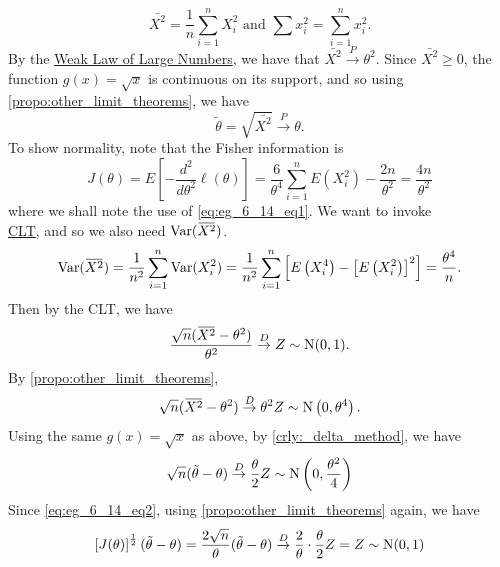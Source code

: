 \documentclass[notoc,notitlepage]{tufte-book}
\newcommand{\convd}{\overset{D}{\to}}
\newcommand{\convp}{\overset{P}{\to}}
\begin{document}
\begin{solution}
\begin{equation*}
    \bar{X^2} = \frac{1}{n} \sum_{i=1}^{n} X_i^2 \text{ and } \sum x_i^2 = \sum_{i=1}^{n} x_i^2.
  \end{equation*}
  By the \hyperref[eg:weak_law_of_large_numbers]{Weak Law of Large Numbers}, we have that $\bar{X^2} \convp \theta^2$. Since $\bar{X^2} \geq 0$, the function $g(x) = \sqrt{x}$ is continuous on its support, and so using \cref{propo:other_limit_theorems}, we have
  \begin{equation*}
    \tilde{\theta} = \sqrt{ \bar{X^2} } \convp \theta.
  \end{equation*}
  To show normality, note that the Fisher information is
  \begin{equation}\label{eq:eg_6_14_eq2}
    J(\theta) = E\left[ - \frac{d^2}{d \theta^2} \ell(\theta) \right] = \frac{6}{\theta^4} \sum_{i=1}^{n} E(X_i^2) - \frac{2n}{\theta^2} = \frac{4n}{\theta^2}
  \end{equation}
  where we shall note the use of \cref{eq:eg_6_14_eq1}. We want to invoke \\
  \noindent\hyperref[thm:central_limit_theorem]{CLT}, and so we also need $\Var(\bar{X^2})$.
  \begin{equation*}
    \Var(\bar{X^2}) = \frac{1}{n^2} \sum_{i=1}^{n} \Var(X_i^2) = \frac{1}{n^2} \sum_{i=1}^{n} \left[ E\left(X_i^4\right) - \left[ E\left(X_i^2\right) \right]^2 \right] = \frac{\theta^4}{n}.
  \end{equation*}
  Then by the CLT, we have
  \begin{equation*}
    \frac{\sqrt{n} ( \bar{X^2} - \theta^2 )}{\theta^2} \convd Z \sim \Nor(0, 1).
  \end{equation*}
  By \cref{propo:other_limit_theorems},
  \begin{equation*}
    \sqrt{n} ( \bar{X^2} - \theta^2 ) \convd \theta^2 Z \sim \Nor\left(0, \theta^4\right).
  \end{equation*}
  Using the same $g(x) = \sqrt{x}$ as above, by \cref{crly:_delta_method}, we have
  \begin{equation*}
    \sqrt{n}( \tilde{\theta} - \theta ) \convd \frac{\theta}{2} Z \sim \Nor\left(0, \frac{\theta^2}{4}\right)
  \end{equation*}
  Since \cref{eq:eg_6_14_eq2}, using \cref{propo:other_limit_theorems} again, we have
  \begin{equation*}
    \left[ J(\theta) \right]^{\frac{1}{2}} ( \tilde{\theta} - \theta ) = \frac{2\sqrt{n}}{\theta} ( \tilde{\theta} - \theta ) \convd \frac{2}{\theta} \cdot \frac{\theta}{2} Z = Z \sim \Nor(0, 1)
  \end{equation*}

\end{solution}
\end{document}
